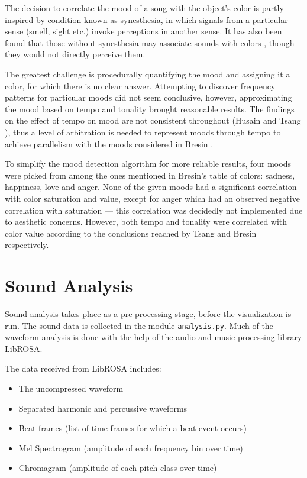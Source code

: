 \documentclass{article}
\newcommand{\code}{\texttt}
\begin{document}
The decision to correlate the mood of a song with the object's color is partly inspired by condition known as synesthesia, in which signals from a particular sense (smell, sight etc.) invoke perceptions in another sense. It has also been found that those without synesthesia may associate sounds with colors \cite{tsang}, though they would not directly perceive them.

The greatest challenge is procedurally quantifying the mood and assigning it a color, for which there is no clear answer. Attempting to discover frequency patterns for particular moods did not seem conclusive, however, approximating the mood based on tempo and tonality brought reasonable results. The findings on the effect of tempo on mood are not consistent throughout (Husain \cite{husain} and Tsang \cite{tsang}), thus a level of arbitration is needed to represent moods through tempo to achieve parallelism with the moods considered in Bresin \cite{bresin}.

To simplify the mood detection algorithm for more reliable results, four moods were picked from among the ones mentioned in Bresin's table of colors: sadness, happiness, love and anger. None of the given moods had a significant correlation with color saturation and value, except for anger which had an observed negative correlation with saturation --- this correlation was decidedly not implemented due to aesthetic concerns. However, both tempo and tonality were correlated with color value according to the conclusions reached by Tsang and Bresin respectively.

\section{Sound Analysis}

Sound analysis takes place as a pre-processing stage, before the visualization is run. The sound data is collected in the module \code{analysis.py}. Much of the waveform analysis is done with the help of the audio and music processing library \href{https://github.com/bmcfee/librosa/}{LibROSA}.

The data received from LibROSA includes:

\begin{itemize}
    \item The uncompressed waveform
    \item Separated harmonic and percussive waveforms
    \item Beat frames (list of time frames for which a beat event occurs)
    \item Mel Spectrogram (amplitude of each frequency bin over time)
    \item Chromagram (amplitude of each pitch-class over time)
\end{itemize}
\end{document}
